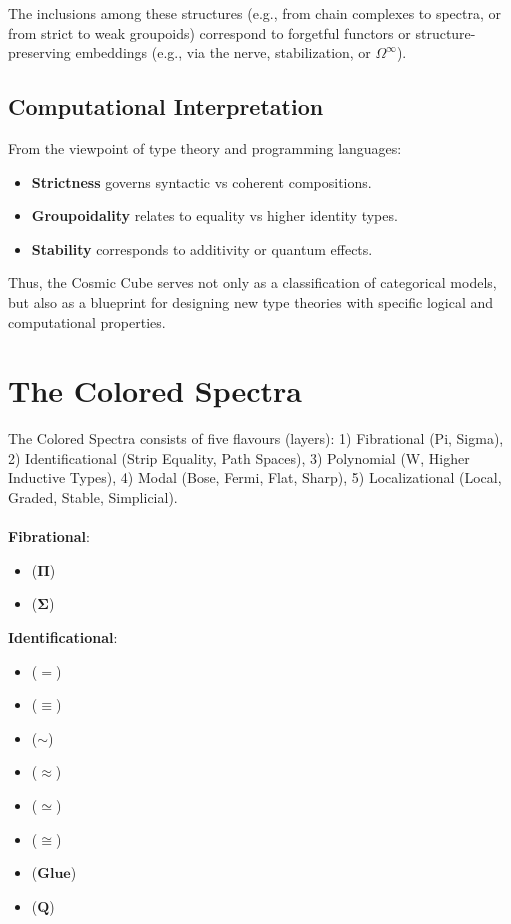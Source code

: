 \documentclass{article}
\begin{document}
The inclusions among these structures (e.g., from chain
complexes to spectra, or from strict to weak groupoids)
correspond to forgetful functors or structure-preserving
embeddings (e.g., via the nerve, stabilization, or $\Omega^\infty$).

\subsection{Computational Interpretation}

From the viewpoint of type theory and programming languages:

\begin{itemize}
\item \textbf{Strictness} governs syntactic vs coherent compositions.
\item \textbf{Groupoidality} relates to equality vs higher identity types.
\item \textbf{Stability} corresponds to additivity or quantum effects.
\end{itemize}

Thus, the Cosmic Cube serves not only as a classification of categorical models, but also as a blueprint for designing new type theories with specific logical and computational properties.

\section{The Colored Spectra}

The Colored Spectra consists of five flavours (layers):
1) Fibrational (Pi, Sigma),
2) Identificational (Strip Equality, Path Spaces),
3) Polynomial (W, Higher Inductive Types),
4) Modal (Bose, Fermi, Flat, Sharp),
5) Localizational (Local, Graded, Stable, Simplicial).
\\
\\
\noindent \textbf{Fibrational}:
\begin{itemize}
\item {} ($\mathbf{\Pi}$)
\item {} ($\mathbf{\Sigma}$)
\end{itemize}

\noindent \textbf{Identificational}:
\begin{itemize}
\item {} ($\mathbf{=}$)
\item {} ($\mathbf{\equiv}$)
\item {} ($\mathbf{\sim}$)
\item {} ($\mathbf{\approx}$)
\item {} ($\mathbf{\simeq}$)
\item {} ($\mathbf{\cong}$)
\item {} ($\mathbf{Glue}$)
\item {} ($\mathbf{Q}$)
\end{itemize}
\end{document}
